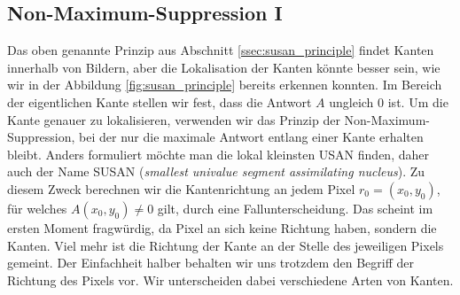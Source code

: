\documentclass[a4paper, 11pt]{report}
\renewcommand{\emph}[1]{\textit{#1}}
\theoremstyle{definition}
\begin{document}
		\subsection{Non-Maximum-Suppression I}\label{ssec:nonmax}
			Das oben genannte Prinzip aus Abschnitt \ref{ssec:susan_principle} findet Kanten innerhalb von Bildern, aber die Lokalisation der Kanten könnte besser sein, wie wir in der Abbildung \ref{fig:susan_principle} bereits erkennen konnten. Im Bereich der eigentlichen Kante stellen wir fest, dass die Antwort $A$ ungleich $0$ ist. Um die Kante genauer zu lokalisieren, verwenden wir das Prinzip der Non-Maximum-Suppression, bei der nur die maximale Antwort entlang einer Kante erhalten bleibt. Anders formuliert möchte man die lokal kleinsten USAN finden, daher auch der Name SUSAN (\emph{smallest univalue segment assimilating nucleus}).
			Zu diesem Zweck berechnen wir die Kantenrichtung an jedem Pixel $r_0 = (x_0, y_0)$, für welches $A(x_0, y_0) \neq 0$ gilt, durch eine Fallunterscheidung. Das scheint im ersten Moment fragwürdig, da Pixel an sich keine Richtung haben, sondern die Kanten. Viel mehr ist die Richtung der Kante an der Stelle des jeweiligen Pixels gemeint. Der Einfachheit halber behalten wir uns trotzdem den Begriff der Richtung des Pixels vor. Wir unterscheiden dabei verschiedene Arten von Kanten.
\end{document}
